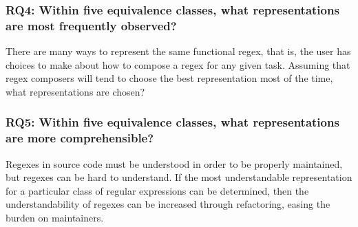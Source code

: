 \subsubsection{RQ4: Within five equivalence classes, what representations are most frequently observed?}

There are many ways to represent the same functional regex, that is, the user has choices to make about how to compose a regex for any given task.  Assuming that regex composers will tend to choose the best representation most of the time, what representations are chosen?

\subsubsection{RQ5: Within five equivalence classes, what representations are more comprehensible?}

Regexes in source code must be understood in order to be properly maintained, but regexes can be hard to understand.  If the most understandable representation for a particular class of regular expressions can be determined, then the understandability of regexes can be increased through refactoring, easing the burden on maintainers.
